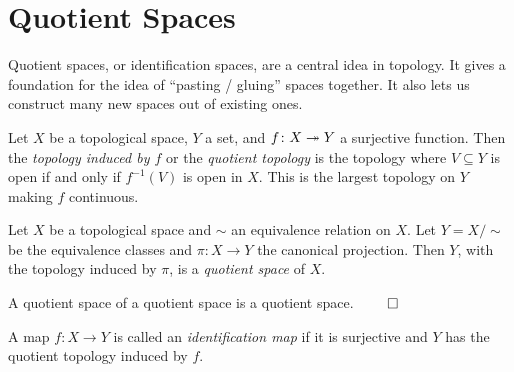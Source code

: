 \documentclass[letterpaper, 11pt, oneside]{book}
\begin{document}
\clearpage

\chapter{Quotient Spaces}

Quotient spaces, or identification spaces, are a central idea in topology.
It gives a foundation for the idea of ``pasting / gluing'' spaces together.
It also lets us construct many new spaces out of existing ones.

\begin{defn}
  Let $X$ be a topological space, $Y$ a set, and $f\colon X \onto Y$ a surjective function.
  Then the \emph{topology induced by $f$} or the \emph{quotient topology} is the topology where $V \subseteq Y$ is open if and only if $f^{-1}(V)$ is open in $X$.
  This is the largest topology on $Y$ making $f$ continuous.
\end{defn}

\begin{defn}
  Let $X$ be a topological space and $\sim$ an equivalence relation on $X$.
  Let $Y = X / \sim$ be the equivalence classes and $\pi\colon X \to Y$ the canonical projection.
  Then $Y$, with the topology induced by $\pi$, is a \emph{quotient space} of $X$.
\end{defn}

\begin{prop}
  A quotient space of a quotient space is a quotient space. $\qed$
\end{prop}

\begin{defn}
  A map $f\colon X \to Y$ is called an \emph{identification map} if it is surjective and $Y$ has the quotient topology induced by $f$.
\end{defn}
\end{document}
